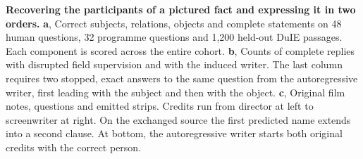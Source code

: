 \textbf{Recovering the participants of a pictured fact and expressing it in two orders.}
\textbf{a}, Correct subjects, relations, objects and complete statements on 48 human questions, 32 programme questions and 1,200 held-out DuIE passages. Each component is scored across the entire cohort.
\textbf{b}, Counts of complete replies with disrupted field supervision and with the induced writer. The last column requires two stopped, exact answers to the same question from the autoregressive writer, first leading with the subject and then with the object.
\textbf{c}, Original film notes, questions and emitted strips. Credits run from director at left to screenwriter at right. On the exchanged source the first predicted name extends into a second clause. At bottom, the autoregressive writer starts both original credits with the correct person.
